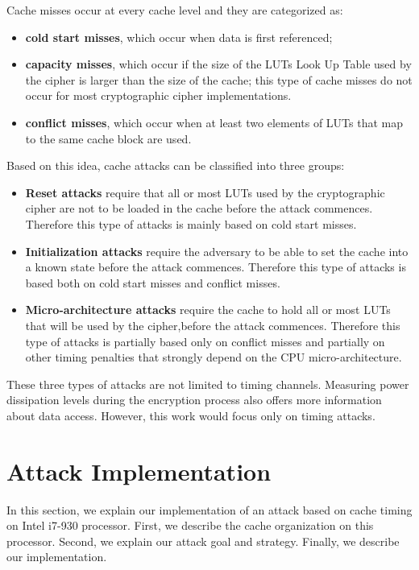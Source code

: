 \documentclass[twocolumn]{IEEEtran}
\begin{document}
Cache misses occur at every cache level and they are categorized as:

\begin {itemize}
\item \textbf{cold start misses}, which occur when data is first referenced;
\item \textbf{capacity misses}, which occur if the size of the LUTs Look Up Table used by the cipher is larger than the size of the cache; this type of cache misses do not occur for most cryptographic cipher implementations.
\item \textbf{conflict misses}, which occur when at least two elements of LUTs that map to the same cache block are used.
\end {itemize}

Based on this idea, cache attacks can be classified into three groups:

\begin {itemize}

\item \textbf{Reset attacks} require that all or most LUTs used by the cryptographic cipher are not to be loaded in the cache before the attack commences. Therefore this type of attacks is mainly based on cold start misses.

\item \textbf{Initialization attacks} require the adversary to be able to set the cache into a known state before the attack commences. Therefore this type of attacks is based both on cold start misses and conflict misses.

\item \textbf{Micro-architecture attacks} require the cache to hold all or most LUTs that will be used by the cipher,before the attack commences. Therefore this type of attacks is partially based only on conflict misses and partially on other timing penalties that
strongly depend on the CPU micro-architecture. 

\end {itemize}

These three types of attacks are not limited to timing channels. Measuring power dissipation levels during the encryption process also offers more information about data access. However, this work would focus only on timing attacks.

\section {Attack Implementation}
In this section, we explain our implementation of an attack based on cache timing on Intel i7-930 processor. First, we describe the cache organization on this processor. Second, we explain our attack goal and strategy. Finally, we describe our implementation.
\end{document}
